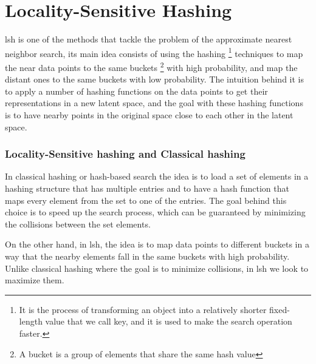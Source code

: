 \section{Locality-Sensitive Hashing}

\acrfull{lsh} is one of the methods that tackle the problem of the approximate
nearest neighbor search, its main idea consists of using the hashing
\footnote{It is the process of transforming an object into a relatively shorter
fixed-length value that we call key, and it is used to make the search operation
faster.} techniques to map the near data points to the same buckets \footnote{A
bucket is a group of elements that share the same hash value} with high
probability, and map the distant ones to the same buckets with low probability.
The intuition behind it is to apply a number of hashing functions on the data
points to get their representations in a new latent space, and the goal with
these hashing functions is to have nearby points in the original space close to
each other in the latent space.


\subsubsection{Locality-Sensitive hashing and Classical hashing}
In classical hashing or hash-based search the idea is to load a set of elements
in a hashing structure that has multiple entries and to have a hash function
that maps every element from the set to one of the entries. The goal behind this
choice is to speed up the search process, which can be guaranteed by minimizing
the collisions between the set elements.

On the other hand, in \acrlong{lsh}, the idea is to map data points to different
\glspl{bucket} in a way that the nearby elements fall in the same buckets with high
probability. Unlike classical hashing where the goal is to minimize collisions,
in \acrshort{lsh} we look to maximize them.
